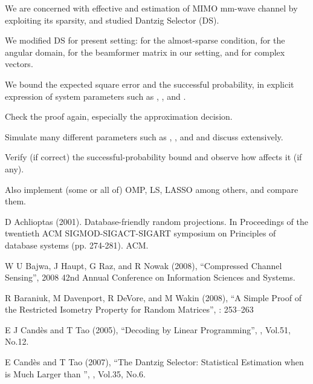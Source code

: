 {
\I We are concerned with effective and estimation of MIMO mm-wave channel by exploiting its sparsity, and studied Dantzig Selector (DS).

\I We modified DS for present setting: for the almost-sparse condition, for the angular domain, for the beamformer matrix  in our setting, and for complex vectors.

\I We bound the expected square error and the successful probability, in explicit expression of system parameters such as , , and .
}
{
\I Check the proof again, especially the approximation decision.

\I Simulate many different parameters such as , , and  and discuss extensively.

\I Verify (if correct) the successful-probability bound and observe how  affects it (if any).

\I Also implement (some or all of) OMP, LS, LASSO among others, and compare them.
}
{
{\tfx
\I D Achlioptas (2001). Database-friendly random projections. In Proceedings of the twentieth ACM SIGMOD-SIGACT-SIGART symposium on Principles of database systems (pp. 274-281). ACM.

\I W U Bajwa, J Haupt, G Raz, and R Nowak (2008), ``Compressed Channel Sensing'', 2008 42nd Annual Conference on Information Sciences and Systems.

\I R Baraniuk, M Davenport, R DeVore, and M Wakin (2008), ``A Simple Proof of the Restricted Isometry Property for Random Matrices'',  : 253–263

\I E J Cand\`es and T Tao (2005), ``Decoding by Linear Programming'', , Vol.51, No.12.

\I E Cand\`es and T Tao (2007), ``The Dantzig Selector: Statistical Estimation when  is Much Larger than '', , Vol.35, No.6.
}
}

